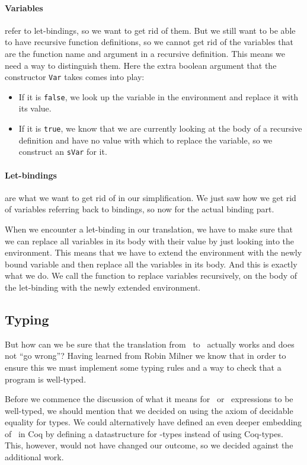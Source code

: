 \documentclass[11pt, leqno, titlepage]{article}
\def\coqe{\lstinline[language=Coq, basicstyle=\small]}
\theoremstyle{definition}
\begin{document}
\paragraph{Variables} refer to let-bindings, so we want to get rid of them. But we
still want to be able to have recursive function definitions, so we cannot get rid
of the variables that are the function name and argument in a recursive
definition. This means we need a way to distinguish them. Here the extra boolean
argument that the constructor \coqe{Var} takes comes into play:
\begin{itemize}
    \item If it is \texttt{false}, we look up the variable in the environment and
  replace it with its value.
    \item If it is \texttt{true}, we know that we are currently looking at the body
  of a recursive definition and have no value with which to replace the variable, so
  we construct an \coqe{sVar} for it. 
\end{itemize}

\paragraph{Let-bindings} are what we want to get rid of in our simplification. We
just saw how we get rid of variables referring back to bindings, so now for the
actual binding part.

When we encounter a let-binding in our translation, we have to make sure that we can
replace all variables in its body with their value by just looking into the
environment. This means that we have to extend the environment with the newly bound
variable and then replace all the variables in its body. And this is exactly what we
do. We call the function to replace variables recursively, on the body of the
let-binding with the newly extended environment. 


\subsection{Typing \rmlx}
\label{sec:typing-rmlx}
But how can we be sure that the translation from \rmlx\ to \srml\ actually works and
does not ``go wrong''? 
Having learned from Robin Milner \cite{milner}
we know that in order to ensure this we must implement some typing rules and a way to
check that a program is well-typed.

Before we commence the discussion of what it means for \rmlx\ or \srml\ expressions
to be well-typed, we should mention that we decided on using the axiom of decidable
equality for types. We could alternatively have defined an even deeper embedding of
\rml\ in Coq by defining a datastructure for \rml -types instead of using
Coq-types. This, however, would not have changed our outcome, so we decided against
the additional work.
\end{document}

